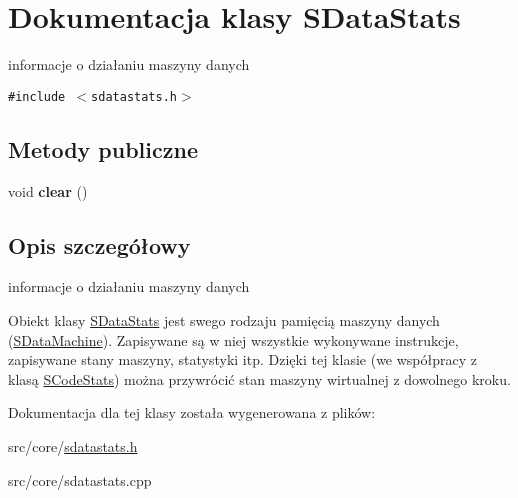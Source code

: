 \hypertarget{classSDataStats}{
\section{Dokumentacja klasy SDataStats}
\label{classSDataStats}
}
informacje o działaniu maszyny danych  


{\tt \#include $<$sdatastats.h$>$}

\subsection*{Metody publiczne}
\begin{CompactItemize}
\item 
\hypertarget{classSDataStats_d160ed884fc050114b9bac8551cc50f9}{
void \textbf{clear} ()}
\label{classSDataStats_d160ed884fc050114b9bac8551cc50f9}

\end{CompactItemize}


\subsection{Opis szczegółowy}
informacje o działaniu maszyny danych 

Obiekt klasy \hyperlink{classSDataStats}{SDataStats} jest swego rodzaju pamięcią maszyny danych (\hyperlink{classSDataMachine}{SDataMachine}). Zapisywane są w niej wszystkie wykonywane instrukcje, zapisywane stany maszyny, statystyki itp. Dzięki tej klasie (we współpracy z klasą \hyperlink{classSCodeStats}{SCodeStats}) można przywrócić stan maszyny wirtualnej z dowolnego kroku. 

Dokumentacja dla tej klasy została wygenerowana z plików:\begin{CompactItemize}
\item 
src/core/\hyperlink{sdatastats_8h}{sdatastats.h}\item 
src/core/sdatastats.cpp\end{CompactItemize}
